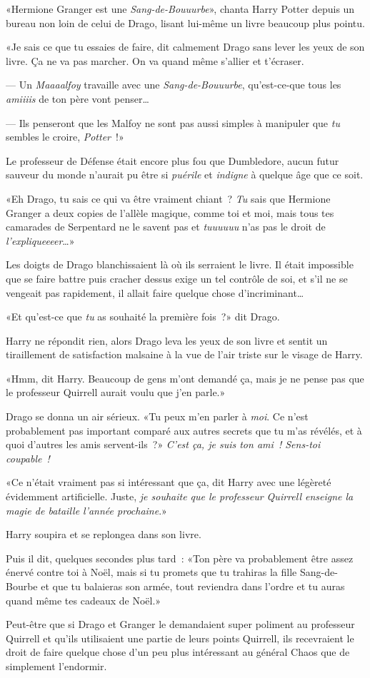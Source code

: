 «Hermione Granger est une \emph{Sang-de-Bouuurbe}», chanta Harry Potter depuis un bureau non loin de celui de Drago, lisant lui-même un livre beaucoup plus pointu.

«Je sais ce que tu essaies de faire, dit calmement Drago sans lever les yeux de son livre. Ça ne va pas marcher. On va quand même s'allier et t'écraser.

--- Un \emph{Maaaalfoy} travaille avec une \emph{Sang-de-Bouuurbe}, qu'est-ce-que tous les \emph{amiiiis} de ton père vont penser…

--- Ils penseront que les Malfoy ne sont pas aussi simples à manipuler que \emph{tu} sembles le croire, \emph{Potter}~!»

Le professeur de Défense était encore plus fou que Dumbledore, aucun futur sauveur du monde n'aurait pu être si \emph{puérile} et \emph{indigne} à quelque âge que ce soit.

«Eh Drago, tu sais ce qui va être vraiment chiant~? \emph{Tu} sais que Hermione Granger a deux copies de l'allèle magique, comme toi et moi, mais tous tes camarades de Serpentard ne le savent pas et \emph{tuuuuuu} n'as pas le droit de \emph{l'expliqueeeer}…»

Les doigts de Drago blanchissaient là où ils serraient le livre. Il était impossible que se faire battre puis cracher dessus exige un tel contrôle de soi, et s'il ne se vengeait pas rapidement, il allait faire quelque chose d'incriminant…

«Et qu'est-ce que \emph{tu} as souhaité la première fois~?» dit Drago.

Harry ne répondit rien, alors Drago leva les yeux de son livre et sentit un tiraillement de satisfaction malsaine à la vue de l'air triste sur le visage de Harry.

«Hmm, dit Harry. Beaucoup de gens m'ont demandé ça, mais je ne pense pas que le professeur Quirrell aurait voulu que j'en parle.»

Drago se donna un air sérieux. «Tu peux m'en parler à \emph{moi}. Ce n'est probablement pas important comparé aux autres secrets que tu m'as révélés, et à quoi d'autres les amis servent-ils~?» \emph{C'est ça, je suis ton ami~! Sens-toi coupable~!}

«Ce n'était vraiment pas si intéressant que ça, dit Harry avec une légèreté évidemment artificielle. Juste, \emph{je souhaite que le professeur Quirrell enseigne la magie de bataille l'année prochaine}.»

Harry soupira et se replongea dans son livre.

Puis il dit, quelques secondes plus tard~: «Ton père va probablement être assez énervé contre toi à Noël, mais si tu promets que tu trahiras la fille Sang-de-Bourbe et que tu balaieras son armée, tout reviendra dans l'ordre et tu auras quand même tes cadeaux de Noël.»

Peut-être que si Drago et Granger le demandaient super poliment au professeur Quirrell et qu'ils utilisaient une partie de leurs points Quirrell, ils recevraient le droit de faire quelque chose d'un peu plus intéressant au général Chaos que de simplement l'endormir.~

